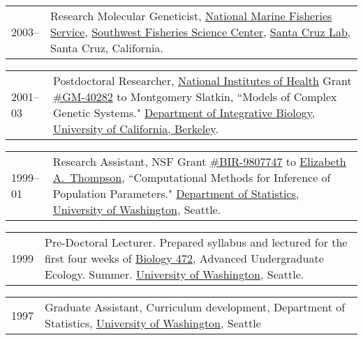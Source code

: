 \documentclass[11pt]{article}
\newlength{\myindent}
\newlength{\scndcol}
\begin{document}
\begin{tabular}{ @{}p{2.5\myindent} p{\scndcol}@{}  }
\hspace*{\myindent}2003-- & Research Molecular Geneticist, \href{http://www.nmfs.noaa.gov/}{National 
Marine Fisheries Service}, \href{http://swfsc.nmfs.noaa.gov/}{Southwest Fisheries Science Center}, \href{http://santacruz.nmfs.noaa.gov/}{Santa Cruz Lab}, Santa Cruz,  California. 
\\
\end{tabular}

\begin{tabular}{ @{}p{2.5\myindent} p{\scndcol}@{}  }
\hspace*{\myindent}2001--03 &  Postdoctoral Researcher, \href{http://www.nih.gov/}{National Institutes of Health} Grant
\href{http://crisp.cit.nih.gov/crisp/CRISP_LIB.getdoc?textkey=6646473\&p_grant_num=5R01GM040282-16\&p_query=\&ticket=8287715\&p_audit_session_id=37483287\&p_keywords=}{\#GM-40282} to Montgomery Slatkin, ``Models of Complex Genetic Systems." \href{http://ib.berkeley.edu/}{Department of 
Integrative Biology}, \href{http://www.berkeley.edu/}{University of California, Berkeley}. 
\end{tabular}

\begin{tabular}{ @{}p{2.5\myindent} p{\scndcol}@{}  }
\hspace*{\myindent}1999--01 &  Research Assistant, NSF Grant \href{http://www.fastlane.nsf.gov/servlet/showaward?award=9807747}{\#BIR-9807747} to
\href{http://www.stat.washington.edu/thompson/}{Elizabeth A.~Thompson}, ``Computational Methods for Inference of Population
Parameters." \href{http://www.stat.washington.edu/}{Department of Statistics}, \href{http://www.washington.edu/}{University of Washington}, Seattle. 
\end{tabular}

\begin{tabular}{ @{}p{2.5\myindent} p{\scndcol}@{}  }
\hspace*{\myindent}1999 &  Pre-Doctoral Lecturer. Prepared syllabus and lectured
for the first four weeks of \href{http://www.washington.edu/students/crscat/biology.html}{Biology 472}, Advanced Undergraduate Ecology.  Summer.  
\href{http://www.washington.edu/}{University of Washington}, Seattle.
\end{tabular}

\begin{tabular}{ @{}p{2.5\myindent} p{\scndcol}@{}  }
\hspace*{\myindent}1997 & Graduate Assistant, Curriculum development,
Department of Statistics, \href{http://www.washington.edu/}{University of Washington}, Seattle\end{tabular}
\end{document}
